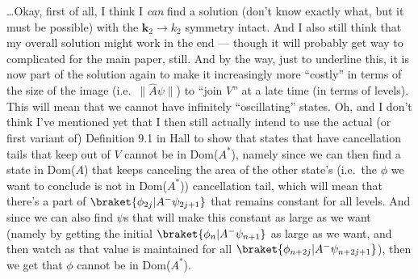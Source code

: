\documentclass{report}
\begin{document}
\ldots Okay, first of all, I think I \emph{can} find a solution (don't know exactly what, but it must be possible) with the $\mathbf{k}_2 \to k_2$ symmetry intact. And I also still think that my overall solution might work in the end --- though it will probably get way to complicated for the main paper, still. And by the way, just to underline this, it is now part of the solution again to make it increasingly more ``costly'' in terms of the size of the image (i.e.\ $\|\hat A \psi\|$) to ``join $V$'' at a late time (in terms of levels). This will mean that we cannot have infinitely ``oscillating'' states. Oh, and I don't think I've mentioned yet that I then still actually intend to use the actual (or first variant of) Definition 9.1 in Hall to show that states that have cancellation tails that keep out of $V$ cannot be in Dom($A^*$), namely since we can then find a state in Dom($A$) that keeps canceling the area of the other state's (i.e.\ the $\phi$ we want to conclude is not in Dom($A^*$)) cancellation tail, which will mean that there's a part of $\braket{\phi_{2j} | A^- \psi_{2j+1}}$ that remains constant for all levels. And since we can also find $\psi$s that will make this constant as large as we want (namely by getting the initial $\braket{\phi_{n} | A^- \psi_{n+1}}$ as large as we want, and then watch as that value is maintained for all $\braket{\phi_{n+2j} | A^- \psi_{n+2j+1}}$), then we get that $\phi$ cannot be in Dom($A^*$). %
\end{document}

